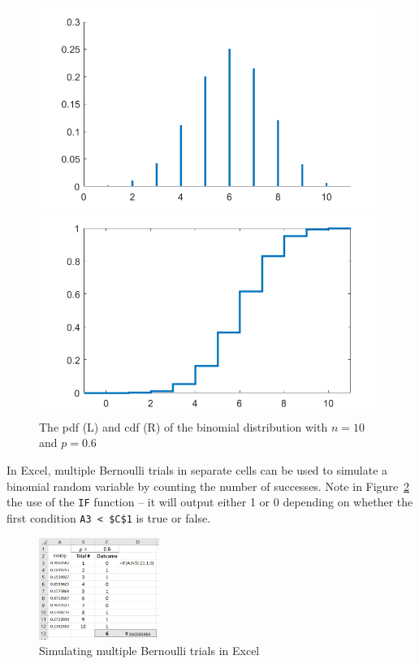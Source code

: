 \begin{figure}[htbp]
 \begin{minipage}{.5\textwidth}
        \centering
	\includegraphics[width=0.9\linewidth]{fig/2_binomial_pdf}
    \end{minipage}
    \begin{minipage}{0.5\textwidth}
        \centering
	\includegraphics[width=0.9\linewidth]{fig/2_binomial_cdf}
    \end{minipage}	
    \caption{The pdf (L) and cdf (R) of the binomial distribution with $n = 10$ and $p = 0.6$\label{fig:2_binomial_pdf}}
\end{figure}



In Excel, multiple Bernoulli trials in separate cells can be used to simulate a binomial random variable by counting the number of successes.
Note in Figure~\ref{fig:excel_binomial} the use of the \texttt{IF} function -- it will output either 1 or 0 depending on whether the first condition \texttt{A3 < \$C\$1} is true or false.


\begin{figure}[htbp]
	\centering
	\includegraphics[width=0.35\textwidth]{fig/2_excel_binomial.png}
	\caption{Simulating multiple Bernoulli trials in Excel}
	\label{fig:excel_binomial}
\end{figure}

